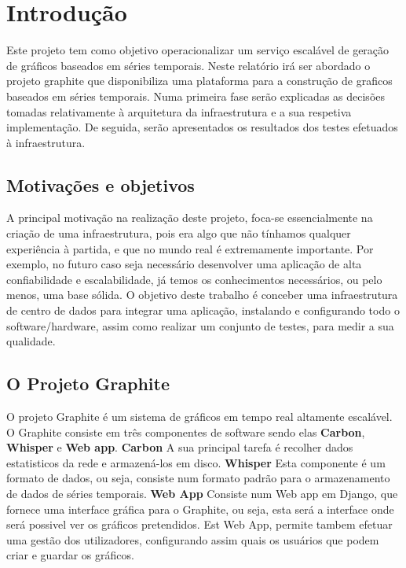 \section{Introdução}

Este projeto tem como objetivo operacionalizar um serviço escalável de geração de gráficos baseados em séries temporais.
Neste relatório irá ser abordado o projeto graphite que disponibiliza uma plataforma para a construção de graficos baseados em séries temporais.
Numa primeira fase serão explicadas as decisões tomadas relativamente à arquitetura da infraestrutura e a sua respetiva implementação.
De seguida, serão apresentados os resultados dos testes efetuados à infraestrutura.

\subsection{Motivações e objetivos}

A principal motivação na realização deste projeto, foca-se essencialmente na criação de uma infraestrutura, pois era algo que não tínhamos qualquer experiência à partida, e que no mundo real é extremamente importante. Por exemplo, no futuro caso seja necessário desenvolver uma aplicação de alta confiabilidade e escalabilidade, já temos os conhecimentos necessários, ou pelo menos, uma base sólida.
O objetivo deste trabalho é conceber uma infraestrutura de centro de dados para integrar uma aplicação, instalando e configurando todo o software/hardware, assim como realizar um conjunto de testes, para medir a sua qualidade.

\subsection{O Projeto Graphite}

O projeto Graphite é um sistema de gráficos em tempo real altamente escalável. O Graphite consiste em três componentes de software sendo elas \textbf{Carbon}, \textbf{Whisper} e \textbf{Web app}.
\textbf{Carbon} A sua principal tarefa é recolher dados estatisticos da rede e armazená-los em disco.
\textbf{Whisper} Esta componente é um formato de dados, ou seja, consiste num formato padrão para o armazenamento de dados de séries temporais.
\textbf{Web App} Consiste num Web app em Django, que fornece uma interface gráfica para o Graphite, ou seja, esta será a interface onde será possivel ver os gráficos pretendidos. Est Web App, permite tambem efetuar uma gestão dos utilizadores, configurando assim quais os usuários que podem criar e guardar os gráficos.
